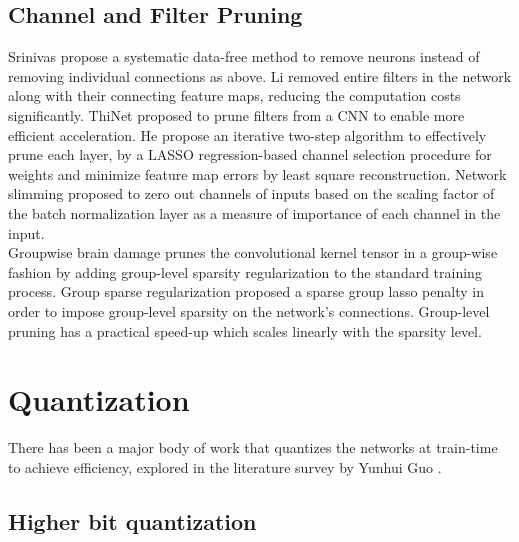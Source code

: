 \subsection{Channel and Filter Pruning}

\noindent Srinivas \etal \cite{srinivas2015data} propose a systematic data-free method to remove neurons instead of removing individual connections as above. Li \etal \cite{li2016pruning} removed entire filters in the network along with their connecting feature maps, reducing the computation costs significantly. ThiNet \cite{luo2017thinet} proposed to prune filters from a CNN to enable more efficient acceleration. He \etal \cite{he2017channel} propose an iterative two-step algorithm to effectively prune each layer, by a LASSO regression-based channel selection procedure for weights and minimize feature map errors by least square reconstruction.  Network slimming \cite{liu2017learning} proposed to zero out channels of inputs based on the scaling factor of the batch normalization layer as a measure of importance of each channel in the input.\\

\noindent Groupwise brain damage \cite{lebedev2016fast} prunes the convolutional kernel tensor in a group-wise fashion by adding group-level sparsity regularization to the standard training process. Group sparse regularization \cite{scardapane2017group} proposed a sparse group lasso penalty in order to impose group-level sparsity on the network’s connections. Group-level pruning has a practical speed-up which scales linearly with the sparsity level.

\section{Quantization}

\noindent There has been a major body of work that quantizes the networks at train-time to achieve efficiency, explored in the literature survey by Yunhui Guo \cite{guo2018survey}.

\subsection{Higher bit quantization}

